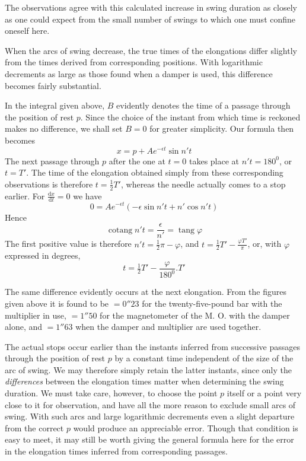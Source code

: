 The observations agree with this calculated increase in swing duration as closely as one could expect from the small number of swings to which one must confine oneself here.

When the arcs of swing decrease, the true times of the elongations differ slightly from the times derived from corresponding positions. With logarithmic decrements as large as those found when a damper is used, this difference becomes fairly substantial.

In the integral given above, $B$ evidently denotes the time of a passage through the position of rest $p$. Since the choice of the instant from which time is reckoned makes no difference, we shall set $B=0$ for greater simplicity. Our formula then becomes
\[
x=p+Ae^{-\epsilon t}\sin n't
\]
The next passage through $p$ after the one at $t=0$ takes place at $n't=180^0$, or $t=T'$. The time of the elongation obtained simply from these corresponding observations is therefore $t=\tfrac12T'$, whereas the needle actually comes to a stop earlier. For $\frac{\mathrm{d}x}{\mathrm{d}t}=0$ we have
\[
0=Ae^{-\epsilon t}(-\epsilon\sin n't+n'\cos n't)
\]
Hence
\[
\operatorname{cotang}n't=\frac{\epsilon}{n'}=\operatorname{tang}\varphi
\]
The first positive value is therefore $n't=\tfrac12\pi-\varphi$, and $t=\tfrac12T'-\frac{\varphi T'}{\pi}$, or, with $\varphi$ expressed in degrees,
\[
t=\tfrac12T'-\frac{\varphi}{180^0}.T'
\]

The same difference evidently occurs at the next elongation. From the figures given above it is found to be $=0''23$ for the twenty-five-pound bar with the multiplier in use, $=1''50$ for the magnetometer of the M. O. with the damper alone, and $=1''63$ when the damper and multiplier are used together.

The actual stops occur earlier than the instants inferred from successive passages through the position of rest $p$ by a constant time independent of the size of the arc of swing. We may therefore simply retain the latter instants, since only the \textit{differences} between the elongation times matter when determining the swing duration. We must take care, however, to choose the point $p$ itself or a point very close to it for observation, and have all the more reason to exclude small arcs of swing. With such arcs and large logarithmic decrements even a slight departure from the correct $p$ would produce an appreciable error. Though that condition is easy to meet, it may still be worth giving the general formula here for the error in the elongation times inferred from corresponding passages.

